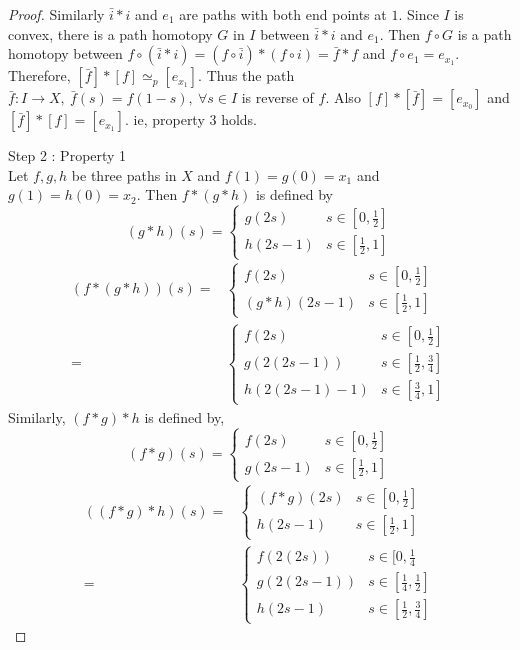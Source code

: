 \begin{proof}
	Similarly $\bar{i} \ast i$ and $e_1$ are paths with both end points at $1$.
	Since $I$ is convex, there is a path homotopy $G$ in $I$ between $\bar{i} \ast i$ and $e_1$.
	Then $f \circ G$ is a path homotopy between $f \circ (\bar{i} \ast i) = (f \circ \bar{i}) \ast (f \circ i) = \bar{f} \ast f$ and $f \circ e_1 = e_{x_1}$.
	Therefore, $[\bar{f}] \ast [f] \simeq_p [e_{x_1}]$.
	Thus the path $\bar{f} : I \to X,\ \bar{f}(s) = f(1-s),\ \forall s \in I$ is reverse of $f$.
	Also $[f] \ast [\bar{f}] = [e_{x_0}]$ and $[\bar{f}] \ast [f] = [e_{x_1}]$.
	ie, property 3 holds.

	Step 2 : Property 1 \\

	Let $f,g,h$ be three paths in $X$ and $f(1) = g(0) = x_1$ and $g(1) = h(0) = x_2$.
	Then $f \ast (g \ast h)$ is defined by 
	\[ (g \ast h)(s) = \begin{cases} g(2s) & s \in [0,\frac{1}{2}] \\ h(2s-1) & s \in [\frac{1}{2},1] \end{cases} \]
	\begin{align*}
		(f \ast (g\ast{}h))(s) =  & \begin{cases} f(2s) & s \in [0,\frac{1}{2}] \\ (g \ast h)(2s-1) & s \in [\frac{1}{2},1] \end{cases} \\
			= & \begin{cases} f(2s) & s \in [0,\frac{1}{2}] \\ g(2(2s-1)) & s \in [\frac{1}{2},\frac{3}{4}] \\ h(2(2s-1)-1) & s \in [\frac{3}{4},1] \end{cases}
	\end{align*}
	Similarly, $(f \ast g) \ast h$ is defined by,
	\[ (f \ast g)(s) = \begin{cases} f(2s) & s \in [0,\frac{1}{2}] \\ g(2s-1) & s \in [\frac{1}{2},1] \end{cases} \]
	\begin{align*}
		((f \ast g) \ast h)(s) = & \begin{cases} (f \ast g)(2s) & s \in [0,\frac{1}{2}] \\ h(2s-1) & s \in [\frac{1}{2},1] \end{cases} \\
			= & \begin{cases} f(2(2s)) & s \in [0,\frac{1}{4} \\ g(2(2s-1)) & s \in [\frac{1}{4},\frac{1}{2}] \\ h(2s-1) & s \in [\frac{1}{2},\frac{3}{4}] \end{cases}
	\end{align*}


\end{proof}
